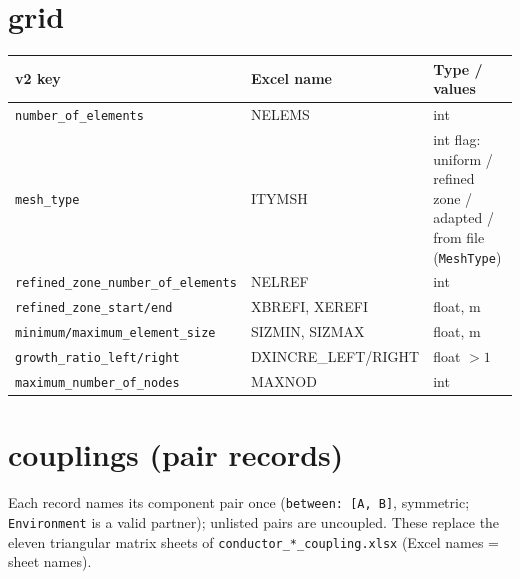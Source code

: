 \documentclass[10pt,a4paper]{article}
\newcommand{\code}[1]{\texttt{#1}}
\begin{document}
\section*{grid}

\begin{longtable}{p{5.6cm}p{3.4cm}p{6.2cm}}
\toprule
\textbf{v2 key} & \textbf{Excel name} & \textbf{Type / values} \\
\midrule
\endhead
\code{number\_of\_elements} & NELEMS & int \\
\code{mesh\_type} & ITYMSH & int flag: uniform / refined zone / adapted / from file (\code{MeshType}) \\
\code{refined\_zone\_number\_of\_elements} & NELREF & int \\
\code{refined\_zone\_start/end} & XBREFI, XEREFI & float, m \\
\code{minimum/maximum\_element\_size} & SIZMIN, SIZMAX & float, m \\
\code{growth\_ratio\_left/right} & DXINCRE\_LEFT/RIGHT & float $>1$ \\
\code{maximum\_number\_of\_nodes} & MAXNOD & int \\
\bottomrule
\end{longtable}

\section*{couplings (pair records)}

Each record names its component pair once (\code{between: [A, B]}, symmetric;
\code{Environment} is a valid partner); unlisted pairs are uncoupled. These
replace the eleven triangular matrix sheets of
\code{conductor\_*\_coupling.xlsx} (Excel names = sheet names).
\end{document}
